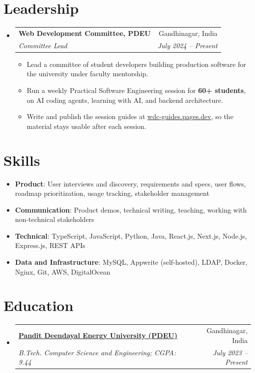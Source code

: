 \documentclass[a4paper,11pt]{article}
\makeatletter
\newcommand{\resumeItem}[2]{
  \item\small{\textbf{#1}{: #2 \vspace{-2pt}}}
}
\newcommand{\resumeSubheadingFull}[4]{
  \vspace{-1pt}\item
    \begin{tabular*}{0.97\textwidth}{l@{\extracolsep{\fill}}r}
    \textbf{#1} & #2 \\
    \textit{#3} & \textit{#4} \\
    \end{tabular*}\vspace{-5pt}
}
\newcommand{\resumeSubItem}[2]{\resumeItem{#1}{#2}\vspace{-3pt}}
\newcommand{\resumeSubHeadingListStart}{\begin{itemize}[leftmargin=*]}
\newcommand{\resumeSubHeadingListEnd}{\end{itemize}}
\newcommand{\resumeItemListStart}{\begin{itemize}[itemsep=1pt,topsep=3pt]\small}
\newcommand{\resumeItemListEnd}{\end{itemize}\vspace{-3pt}}
\makeatother
\begin{document}
\section{Leadership}
  \resumeSubHeadingListStart
    \resumeSubheadingFull{Web Development Committee, PDEU}{Gandhinagar, India}
      {Committee Lead}{July 2024 -- Present}
      \resumeItemListStart
        \item Lead a committee of student developers building production software for the university under faculty mentorship.
        \item Run a weekly Practical Software Engineering session for \textbf{60+ students}, on AI coding agents, learning with AI, and backend architecture.
        \item Write and publish the session guides at \href{https://wdc-guides.pages.dev/guides/}{wdc-guides.pages.dev}, so the material stays usable after each session.
      \resumeItemListEnd
  \resumeSubHeadingListEnd

\section{Skills}
  \resumeSubHeadingListStart
    \resumeSubItem{Product}{User interviews and discovery, requirements and specs, user flows, roadmap prioritization, usage tracking, stakeholder management}
    \resumeSubItem{Communication}{Product demos, technical writing, teaching, working with non-technical stakeholders}
    \resumeSubItem{Technical}{TypeScript, JavaScript, Python, Java, React.js, Next.js, Node.js, Express.js, REST APIs}
    \resumeSubItem{Data and Infrastructure}{MySQL, Appwrite (self-hosted), LDAP, Docker, Nginx, Git, AWS, DigitalOcean}
  \resumeSubHeadingListEnd

\section{Education}
  \resumeSubHeadingListStart
    \resumeSubheadingFull
      {\href{https://pdeu.ac.in/}{Pandit Deendayal Energy University (PDEU)}}{Gandhinagar, India}
      {B.Tech. Computer Science and Engineering; CGPA: 9.44}{July 2023 -- Present}
  \resumeSubHeadingListEnd
\end{document}
